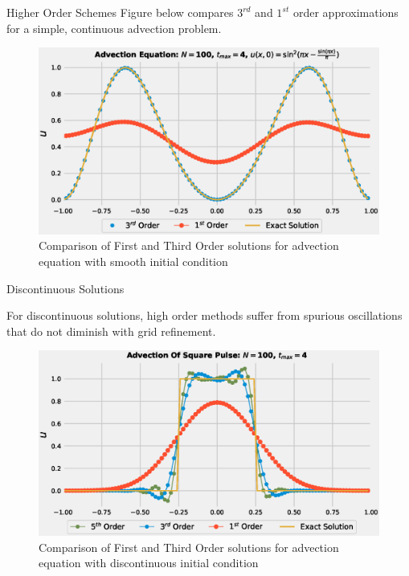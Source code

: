 \documentclass[10pt]{beamer}
\begin{document}
\begin{frame}{Higher Order Schemes}
  Figure below compares $3^{rd}$ and $1^{st}$ order approximations for a simple, continuous advection problem.
    \begin{figure}[H]
      \centering
      \includegraphics[scale=0.45]{AdvectionHighOrderComparison.eps}\caption{Comparison of First and Third Order solutions for advection equation with smooth initial condition}
        \label{fig:First/HighOrderComparison}
      \end{figure}

\end{frame}

\begin{frame}{Discontinuous Solutions}

  For discontinuous solutions, high order methods suffer from spurious oscillations that do not diminish with grid refinement.
  
  \begin{figure}[H]
    \centering
    \includegraphics[scale=0.45]{AdvectionHighOrderComparison_pulse.eps}\caption{Comparison of First and Third Order solutions for advection equation with discontinuous initial condition}
      \label{fig:First/HighOrderComparison_pulse}
    \end{figure}
\end{frame}
\end{document}
